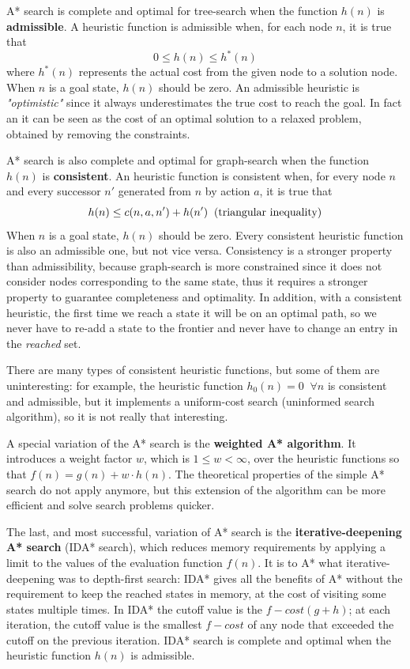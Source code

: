 \documentclass{article}
\begin{document}
A* search is complete and optimal for tree-search when the function $h(n)$ is \textbf{admissible}. A heuristic function is admissible when, for each node $n$, it is true that 
    \[0 \le h(n) \le h^*(n)\]
where $h^*(n)$ represents the actual cost from the given node to a solution node. When $n$ is a goal state, $h(n)$ should be zero. An admissible heuristic is \textit{"optimistic"} since it always underestimates the true cost to reach the goal. In fact an it can be seen as the cost of an optimal solution to a relaxed problem, obtained by removing the constraints.

A* search is also complete and optimal for graph-search when the function $h(n)$ is \textbf{consistent}. An heuristic function is consistent when, for every node $n$ and every successor $n'$ generated from $n$ by action $a$, it is true that 
\[h(n)\le c(n,a,n') + h(n') \;\; \textnormal{(triangular inequality)}\]
When $n$ is a goal state, $h(n)$ should be zero. Every consistent heuristic function is also an admissible one, but not vice versa. Consistency is a stronger property than admissibility, because graph-search is more constrained since it does not consider nodes corresponding to the same state, thus it requires a stronger property to guarantee completeness and optimality. In addition, with a consistent heuristic, the first time we reach a state it will be on an optimal path, so we never have to re-add a state to the frontier and never have to change an entry in the \textit{reached} set.

There are many types of consistent heuristic functions, but some of them are uninteresting: for example, the heuristic function $h_0(n) = 0 \;\; \forall n$ is consistent and admissible, but it implements a uniform-cost search (uninformed search algorithm), so it is not really that interesting.

A special variation of the A* search is the \textbf{weighted A* algorithm}. It introduces a weight factor $w$, which is $1 \le w < \infty$, over the heuristic functions so that $f(n) = g(n) + w \cdot h(n)$. The theoretical properties of the simple A* search do not apply anymore, but this extension of the algorithm can be more efficient and solve search problems quicker.

The last, and most successful, variation of A* search is the \textbf{iterative-deepening A* search} (IDA* search), which reduces memory requirements by applying a limit to the values of the evaluation function $f(n)$. It is to A* what iterative-deepening was to depth-first search: IDA* gives all the benefits of A* without the requirement to keep the reached states in memory, at the cost of visiting some states multiple times. In IDA* the cutoff value is the $f-cost (g+h)$; at each iteration, the cutoff value is the smallest $f-cost$ of any node that exceeded the cutoff on the previous iteration. IDA* search is complete and optimal when the heuristic function $h(n)$ is admissible.
\end{document}
